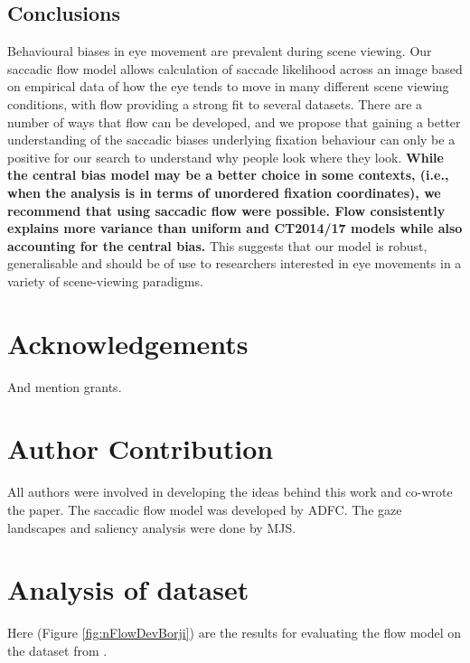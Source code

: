 \documentclass[a4paper, twocolumn, oneside, 11pt]{article}
\begin{document}
\subsection{Conclusions}
Behavioural biases in eye movement are prevalent during scene viewing. Our saccadic flow model allows calculation of saccade likelihood across an image based on empirical data of how the eye tends to move in many different scene viewing conditions, with flow providing a strong fit to several datasets. There are a number of ways that flow can be developed, and we propose that gaining a better understanding of the saccadic biases underlying fixation behaviour can only be a positive for our search to understand why people look where they look. \textbf{While the central bias model may be a better choice in some contexts, (i.e., when the analysis is in terms of unordered fixation coordinates), we recommend that using saccadic flow were possible. Flow consistently explains more variance than uniform and CT2014/17 models while also accounting for the central bias.} This suggests that our model is robust, generalisable and should be of use to researchers interested in eye movements in a variety of scene-viewing paradigms. 


\section*{Acknowledgements}

And mention grants. 

\section*{Author Contribution}

All authors were involved in developing the ideas behind this work and co-wrote the paper. The saccadic flow model was developed by ADFC. The gaze landscapes and saliency analysis were done by MJS.

\appendix



\section{Analysis of \cite{borji2015} dataset}

Here (Figure \ref{fig:nFlowDevBorji}) are the results for evaluating the flow model on the dataset from \cite{borji2015}.
\end{document}
